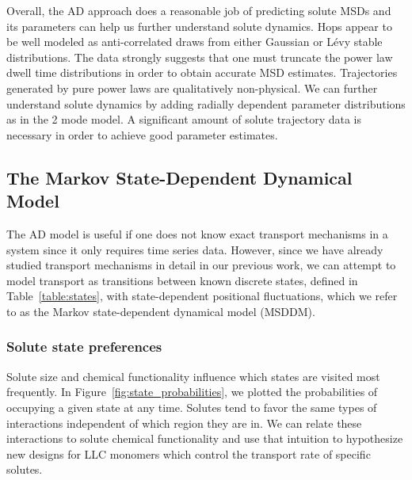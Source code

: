 \documentclass[journal=jctcce,manuscript=article]{achemso}
\begin{document}
  Overall, the AD approach does a reasonable job of predicting solute MSDs and
  its parameters can help us further understand solute dynamics. Hops appear to
  be well modeled as anti-correlated draws from either Gaussian or L\'evy
  stable distributions. The data strongly suggests that one must truncate the
  power law dwell time distributions in order to obtain accurate MSD estimates.
  Trajectories generated by pure power laws are qualitatively non-physical. We
  can further understand solute dynamics by adding radially dependent parameter
  distributions as in the 2 mode model. A significant amount of solute
  trajectory data is necessary in order to achieve good parameter estimates. 

  \subsection{The Markov State-Dependent Dynamical Model}\label{section:msm_results}
  
  The AD model is useful if one does not know exact transport mechanisms 
  in a system since it only requires time series data. However, since we have
  already studied transport mechanisms in detail in our previous work, we can
  attempt to model transport as transitions between known discrete
  states, defined in Table~\ref{table:states}, with state-dependent positional
  fluctuations, which we refer to as the Markov state-dependent dynamical model (MSDDM).

  \subsubsection{Solute state preferences}\label{section:state_preferences}

  Solute size and chemical functionality influence which states are visited
  most frequently.  In Figure~\ref{fig:state_probabilities}, we plotted the
  probabilities of occupying a given state at any time. Solutes tend to favor
  the same types of interactions independent of which region they are in. We
  can relate these interactions to solute chemical functionality and use that
  intuition to hypothesize new designs for LLC monomers which control the
  transport rate of specific solutes.
  
\end{document}
